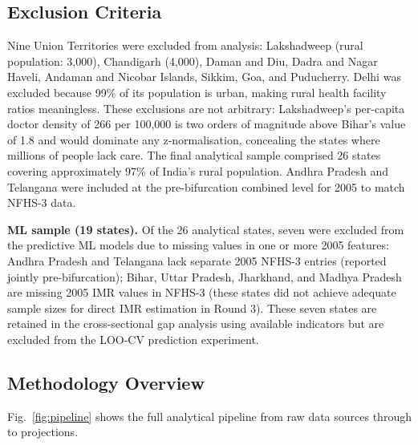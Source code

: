 \documentclass[conference]{IEEEtran}
\begin{document}
\subsection{Exclusion Criteria}

Nine Union Territories were excluded from analysis: Lakshadweep
(rural population: 3,000), Chandigarh (4,000), Daman and Diu,
Dadra and Nagar Haveli, Andaman and Nicobar Islands, Sikkim, Goa,
and Puducherry. Delhi was excluded because 99\% of its population
is urban, making rural health facility ratios meaningless. These
exclusions are not arbitrary: Lakshadweep's per-capita doctor
density of 266 per 100,000 is two orders of magnitude above Bihar's
value of 1.8 and would dominate any z-normalisation, concealing the
states where millions of people lack care. The final analytical
sample comprised 26 states covering approximately 97\% of India's
rural population. Andhra Pradesh and Telangana were included at the
pre-bifurcation combined level for 2005 to match NFHS-3 data.

\textbf{ML sample (19 states).} Of the 26 analytical states, seven
were excluded from the predictive ML models due to missing values
in one or more 2005 features: Andhra Pradesh and Telangana lack
separate 2005 NFHS-3 entries (reported jointly pre-bifurcation);
Bihar, Uttar Pradesh, Jharkhand, and Madhya Pradesh are missing
2005 IMR values in NFHS-3 (these states did not achieve adequate
sample sizes for direct IMR estimation in Round 3). These seven
states are retained in the cross-sectional gap analysis using
available indicators but are excluded from the LOO-CV prediction
experiment.

\subsection{Methodology Overview}

Fig.~\ref{fig:pipeline} shows the full analytical pipeline from
raw data sources through to projections.
\end{document}
